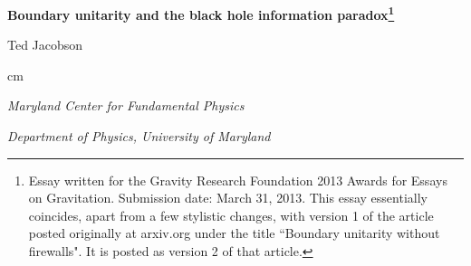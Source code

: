 \documentclass[12pt]{article}
\begin{document}
\begin{center} {\Large \bf
Boundary unitarity and the black hole information paradox\footnote{Essay written for the Gravity Research Foundation 2013 Awards for Essays on Gravitation. Submission date: March 31, 2013.
This essay essentially coincides, apart from a few stylistic changes, with version 1 of the article posted originally at arxiv.org under the title ``Boundary unitarity without firewalls". It is  posted 
as version 2 of that article.
}}
\end{center}


\vskip 5mm
\begin{center} \large
{{Ted Jacobson
}}
\end{center}

 cm
{\centerline{\it Maryland Center for Fundamental Physics}}
{\centerline{\it Department of Physics, University of Maryland}}
\end{document}
